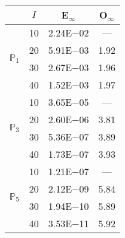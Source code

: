 \begin{table}[H]
\centering
\begin{tabular}{@{}l c c c@{}}
\toprule
 & $I$ & E$_{\infty}$ & O$_{\infty}$\\
\midrule
\multirow{4}{*}{$\mathbb{P}_{1}$}
 & 10 & 2.24E$-$02 & ---\\
 & 20 & 5.91E$-$03 & 1.92  \\
 & 30 & 2.67E$-$03 & 1.96  \\
 & 40 & 1.52E$-$03 & 1.97  \\
\midrule
\multirow{4}{*}{$\mathbb{P}_{3}$}
 & 10 & 3.65E$-$05 & ---\\
 & 20 & 2.60E$-$06 & 3.81  \\
 & 30 & 5.36E$-$07 & 3.89  \\
 & 40 & 1.73E$-$07 & 3.93  \\
\midrule
\multirow{4}{*}{$\mathbb{P}_{5}$}
 & 10 & 1.21E$-$07 & ---\\
 & 20 & 2.12E$-$09 & 5.84  \\
 & 30 & 1.94E$-$10 & 5.89  \\
 & 40 & 3.53E$-$11 & 5.92  \\
\bottomrule
\end{tabular}
\end{table}
